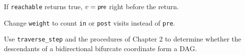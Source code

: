 \begin{lemma}
	If \verb|reachable| returns true, $v = \mathsf{pre}$ right before the return.
\end{lemma}

\begin{exercise}
	Change \verb|weight| to count \verb|in| or \verb|post| visits instead of \verb|pre|.
\end{exercise}



\begin{exercise}
	Use \verb|traverse_step| and the procedures of Chapter 2 to determine whether the
	descendants of a bidirectional bifurcate coordinate form a DAG.
\end{exercise}



